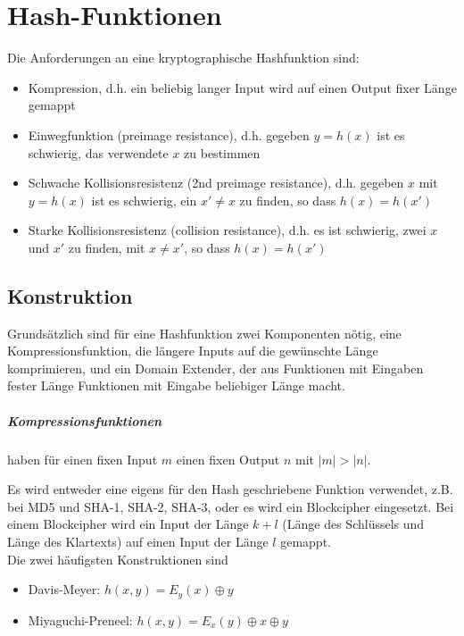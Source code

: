\chapter{Hash-Funktionen}

Die Anforderungen an eine kryptographische Hashfunktion sind:
\begin{itemize}
    \item Kompression, d.h. ein beliebig langer Input wird auf einen Output fixer Länge gemappt
    \item Einwegfunktion (preimage resistance), d.h. gegeben $y = h(x)$ ist es schwierig, das verwendete $x$ zu bestimmen
    \item Schwache Kollisionsresistenz (2nd preimage resistance), d.h. gegeben $x$ mit $y = h(x)$ ist es schwierig, ein $x' \neq x$ zu finden, so dass $h(x) = h(x')$
    \item Starke Kollisionsresistenz (collision resistance), d.h. es ist schwierig, zwei $x$ und $x'$ zu finden, mit $x \neq x'$, so dass $h(x) = h(x')$
\end{itemize}

\section{Konstruktion}

Grundsätzlich sind für eine Hashfunktion zwei Komponenten nötig, eine Kompressionsfunktion, die längere Inputs auf die gewünschte Länge komprimieren, und ein Domain 
Extender, der aus Funktionen mit Eingaben fester Länge Funktionen mit Eingabe beliebiger Länge macht.

\paragraph{Kompressionsfunktionen} haben für einen fixen Input $m$ einen fixen Output $n$ mit $|m| > |n|$.

Es wird entweder eine eigens für den Hash geschriebene Funktion verwendet, z.B. bei MD5 und SHA-1, SHA-2, SHA-3, oder es wird ein Blockcipher eingesetzt. Bei einem 
Blockcipher wird ein Input der Länge $k+l$ (Länge des Schlüssels und Länge des Klartexts) auf einen Input der Länge $l$ gemappt. \\

Die zwei häufigsten Konstruktionen sind
\begin{itemize}
    \item Davis-Meyer: $h(x, y) = E_y(x) \oplus y$
    \item Miyaguchi-Preneel: $h(x, y) = E_x(y) \oplus x \oplus y$
\end{itemize}



